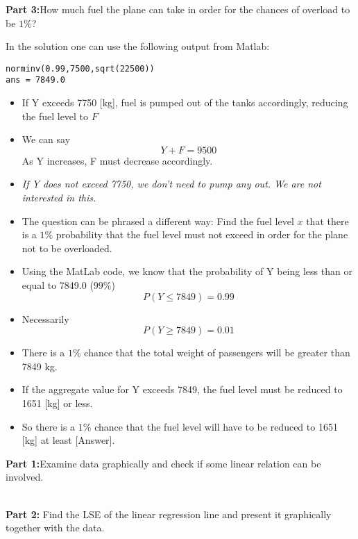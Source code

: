 \noindent\textbf{Part 3:}How much fuel the plane can take in order for the chances of overload to be $1\%$?

In the solution one can use the following output from Matlab:
\begin{verbatim}
norminv(0.99,7500,sqrt(22500))
ans = 7849.0
\end{verbatim}




\begin{itemize}
	\item If Y exceeds 7750 [kg], fuel is pumped out of the tanks accordingly, reducing the fuel level to $F$
	\item We can say \[ Y + F = 9500 \]
	As Y increases, F must decrease accordingly.
	\item \emph{If Y does not exceed 7750, we don't need to pump any out. We are not interested in this.}
	\item The question can be phrased a different way: Find the fuel level $x$ that there is a $1\%$ probability that the fuel level must not exceed in order for the plane not to be overloaded.
	
\end{itemize}




\begin{itemize}
	\item  Using the MatLab code, we know that the probability of Y being less than or equal to 7849.0 ($99\%$)
	\[ P(Y \leq 7849) = 0.99\]
	\item Necessarily  \[ P(Y \geq 7849) = 0.01\]
	\item There is a $1\%$ chance that the total weight of passengers will be greater than 7849 kg.
	\item If the aggregate value for Y exceeds 7849, the fuel level must be reduced to 1651 [kg] or less.
	\item So there is a $1\%$ chance that the fuel level will have to be reduced to 1651 [kg] at least [Answer].
	
\end{itemize}



\noindent\textbf{Part 1:}Examine data graphically and check if some linear relation can be involved.

\\
\bigskip
\noindent\textbf{Part 2: }Find the LSE of the linear regression line and present it graphically together with the data.

